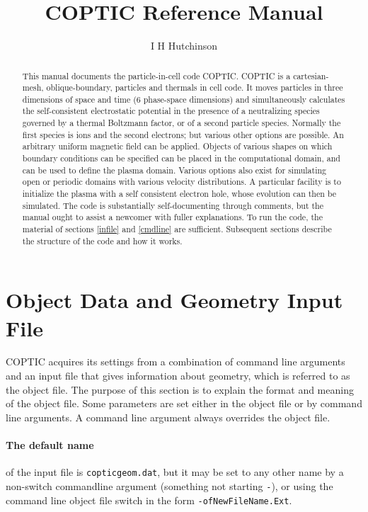 \documentclass[12pt]{article}
\title{COPTIC Reference Manual}
\author{I H Hutchinson}
\begin{document}
\maketitle
\begin{abstract}
  
  This manual documents the particle-in-cell code COPTIC. COPTIC is a
  cartesian-mesh, oblique-boundary, particles and thermals in cell
  code.  It moves particles in three dimensions of space and time (6
  phase-space dimensions) and simultaneously calculates the
  self-consistent electrostatic potential in the presence of a
  neutralizing species governed by a thermal Boltzmann factor, or of a
  second particle species. Normally the first species is ions and the
  second electrons; but various other options are possible.  An
  arbitrary uniform magnetic field can be applied.  Objects of various
  shapes on which boundary conditions can be specified can be placed
  in the computational domain, and can be used to define the plasma
  domain. Various options also exist for simulating open or periodic
  domains with various velocity distributions. A particular facility
  is to initialize the plasma with a self consistent electron hole,
  whose evolution can then be simulated.  The code is substantially
  self-documenting through comments, but the manual ought to assist a
  newcomer with fuller explanations. To run the code, the material of
  sections \ref{infile} and \ref{cmdline} are sufficient. Subsequent
  sections describe the structure of the code and how it works.
\end{abstract}


\tableofcontents


\section{Object Data and Geometry Input File}\label{infile}

COPTIC acquires its settings from a combination of command line
arguments and an input file that gives information about geometry,
which is referred to as the object file.  The purpose of this section
is to explain the format and meaning of the object file. Some
parameters are set either in the object file or by command line
arguments. A command line argument always overrides the object file.


\paragraph{The default name} of the input file is \verb!copticgeom.dat!, but it
may be set to any other name by a non-switch commandline argument
(something not starting \verb!-!), or using the command line object file
switch in the form \verb!-ofNewFileName.Ext!.
\end{document}
